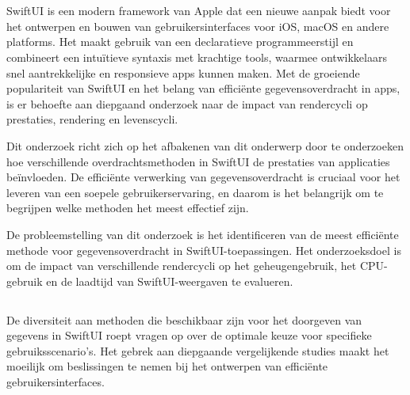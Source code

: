 
\chapter{}%
\label{ch:inleiding}

SwiftUI is een modern framework van Apple dat een nieuwe aanpak biedt voor het ontwerpen en bouwen van gebruikersinterfaces voor iOS, macOS en andere platforms. Het maakt gebruik van een declaratieve programmeerstijl en combineert een intuïtieve syntaxis met krachtige tools, waarmee ontwikkelaars snel aantrekkelijke en responsieve apps kunnen maken. Met de groeiende populariteit van SwiftUI en het belang van efficiënte gegevensoverdracht in apps, is er behoefte aan diepgaand onderzoek naar de impact van rendercycli op prestaties, rendering en levenscycli.

Dit onderzoek richt zich op het afbakenen van dit onderwerp door te onderzoeken hoe verschillende overdrachtsmethoden in SwiftUI de prestaties van applicaties beïnvloeden. De efficiënte verwerking van gegevensoverdracht is cruciaal voor het leveren van een soepele gebruikerservaring, en daarom is het belangrijk om te begrijpen welke methoden het meest effectief zijn.

De probleemstelling van dit onderzoek is het identificeren van de meest efficiënte methode voor gegevensoverdracht in SwiftUI-toepassingen. Het onderzoeksdoel is om de impact van verschillende rendercycli op het geheugengebruik, het CPU-gebruik en de laadtijd van SwiftUI-weergaven te evalueren.

\section{}%
\label{sec:probleemstelling}

%
De diversiteit aan methoden die beschikbaar zijn
voor het doorgeven van gegevens in SwiftUI roept vragen op
over de optimale keuze voor specifieke gebruiksscenario's.
Het gebrek aan diepgaande vergelijkende
studies maakt het
moeilijk om beslissingen te nemen bij het ontwerpen
van efficiënte gebruikersinterfaces.


